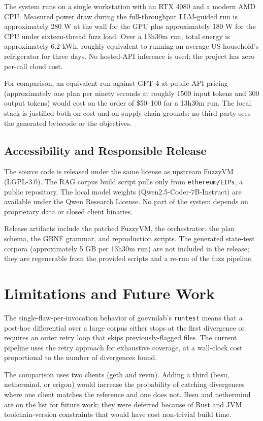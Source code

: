 \documentclass[conference]{IEEEtran}
\begin{document}
The system runs on a single workstation with an RTX 4080 and a modern AMD CPU. Measured power draw during the full-throughput LLM-guided run is approximately 280 W at the wall for the GPU plus approximately 180 W for the CPU under sixteen-thread fuzz load. Over a 13h30m run, total energy is approximately 6.2 kWh, roughly equivalent to running an average US household's refrigerator for three days. No hosted-API inference is used; the project has zero per-call cloud cost.

For comparison, an equivalent run against GPT-4 at public API pricing (approximately one plan per ninety seconds at roughly 1500 input tokens and 300 output tokens) would cost on the order of \$50--100 for a 13h30m run. The local stack is justified both on cost and on supply-chain grounds: no third party sees the generated bytecode or the objectives.

\subsection{Accessibility and Responsible Release}

The source code is released under the same license as upstream FuzzyVM (LGPL-3.0). The RAG corpus build script pulls only from \texttt{ethereum/EIPs}, a public repository. The local model weights (Qwen2.5-Coder-7B-Instruct) are available under the Qwen Research License. No part of the system depends on proprietary data or closed client binaries.

Release artifacts include the patched FuzzyVM, the orchestrator, the plan schema, the GBNF grammar, and reproduction scripts. The generated state-test corpora (approximately 5 GB per 13h30m run) are not included in the release; they are regenerable from the provided scripts and a re-run of the fuzz pipeline.

\section{Limitations and Future Work}

The single-flaw-per-invocation behavior of goevmlab's \texttt{runtest} means that a post-hoc differential over a large corpus either stops at the first divergence or requires an outer retry loop that skips previously-flagged files. The current pipeline uses the retry approach for exhaustive coverage, at a wall-clock cost proportional to the number of divergences found.

The comparison uses two clients (geth and revm). Adding a third (besu, nethermind, or erigon) would increase the probability of catching divergences where one client matches the reference and one does not. Besu and nethermind are on the list for future work; they were deferred because of Rust and JVM toolchain-version constraints that would have cost non-trivial build time.
\end{document}
